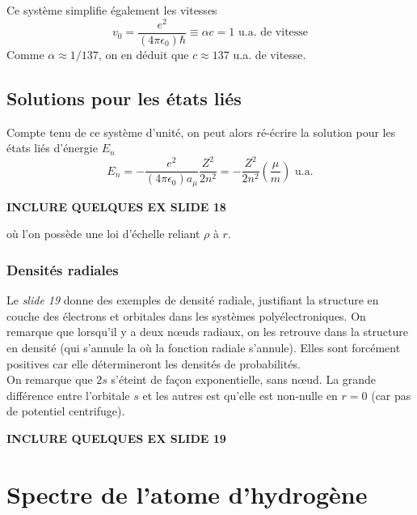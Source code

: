 Ce système simplifie également les vitesses
\begin{equation}
v_0 = \frac{e^2}{(4\pi\epsilon_0)\hbar}\equiv \alpha c = 1 \text{ u.a. de vitesse}
\end{equation}
Comme $\alpha \approx 1/137$, on en déduit que $c\approx 137$ u.a. de vitesse.\\


\subsection{Solutions pour les états liés}
Compte tenu de ce système d'unité, on peut alors ré-écrire la solution pour les états liés d'énergie $E_n$
\begin{equation}
E_n = -\frac{e^2}{(4\pi\epsilon_0)a_\mu}\frac{Z^2}{2n^2}=-\dfrac{Z^2}{2n^2}\left(\frac{\mu}{m}\right)\text{ u.a.}
\end{equation}
\begin{center}
\textbf{INCLURE QUELQUES EX SLIDE 18}
\end{center}
où l'on possède une loi d'échelle reliant $\rho$ à $r$.



\subsubsection{Densités radiales}
Le \textit{slide 19} donne des exemples de densité radiale, justifiant la structure en couche des 
électrons et orbitales dans les systèmes polyélectroniques. On remarque que lorsqu'il y a deux nœuds 
radiaux, on les retrouve dans la structure en densité (qui s'annule la où la fonction radiale s'annule). Elles
sont forcément positives car elle détermineront les densités de probabilités.\\

On remarque que $2s$ s'éteint de façon exponentielle, sans nœud. La grande différence entre l'orbitale $s$ et
les autres est qu'elle est non-nulle en $r=0$ (car pas de potentiel centrifuge).

\begin{center}
\textbf{INCLURE QUELQUES EX SLIDE 19}
\end{center}

\newpage
\section{Spectre de l’atome d’hydrogène}

